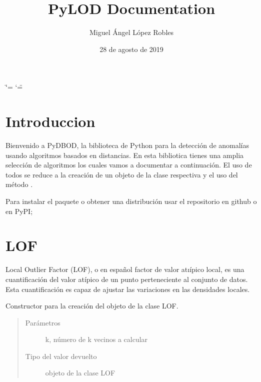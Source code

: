 \documentclass[letterpaper,10pt,spanish]{sphinxmanual}
\title{PyLOD Documentation}
\date{28 de agosto de 2019}
\author{Miguel Ángel López Robles}
\begin{document}
\ifdefined\shorthandoff
  \ifnum\catcode`\=\string=\active\shorthandoff{=}\fi
  \ifnum\catcode`\"=\active{}\fi
\fi

\pagestyle{empty}
\sphinxmaketitle
\pagestyle{plain}
\sphinxtableofcontents
\pagestyle{normal}
\label{\detokenize{index::doc}}



\chapter{Introduccion}
\label{\detokenize{index:introduccion}}
Bienvenido a PyDBOD, la biblioteca de Python para la detección de anomalías usando
algoritmos basados en distancias. En esta bibliotica tienes una amplia selección de
algoritmos los cuales vamos a documentar a continuación. El uso de todos se reduce a
la creación de un objeto de la clase respectiva y el uso del método .

Para instalar el paquete o obtener una distribución usar el repositorio en github o
en PyPI;




\chapter{LOF}
\label{\detokenize{index:lof}}
Local Outlier Factor (LOF), o en español factor de valor atıípico local, es
una cuantificación del valor atípico de un punto perteneciente al conjunto de
datos. Esta cuantificación es capaz de ajustar las variaciones en las densidades
locales.

\begin{fulllineitems}
\label{\detokenize{index:LOF}}
Constructor para la creación del objeto de la clase LOF.
\begin{quote}\begin{description}
\item[{Parámetros}] \leavevmode
{} \textendash{} k, número de k vecinos a calcular

\item[{Tipo del valor devuelto}] \leavevmode
objeto de la clase LOF

\end{description}\end{quote}

\end{fulllineitems}
\end{document}
